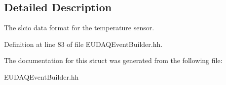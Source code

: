 \subsection{Detailed Description}
The slcio data format for the temperature sensor. 

Definition at line 83 of file E\-U\-D\-A\-Q\-Event\-Builder.\-hh.



The documentation for this struct was generated from the following file\-:\begin{DoxyCompactItemize}
\item 
E\-U\-D\-A\-Q\-Event\-Builder.\-hh\end{DoxyCompactItemize}
